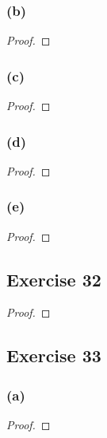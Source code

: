 \documentclass[14pt]{extarticle}
\begin{document}
\subsubsection{(b)}

\begin{proof}

\end{proof}

\subsubsection{(c)}

\begin{proof}

\end{proof}

\subsubsection{(d)}

\begin{proof}

\end{proof}

\subsubsection{(e)}

\begin{proof}

\end{proof}

\subsection{Exercise 32}

\begin{proof}

\end{proof}

\subsection{Exercise 33}

\subsubsection{(a)}

\begin{proof}

\end{proof}
\end{document}
